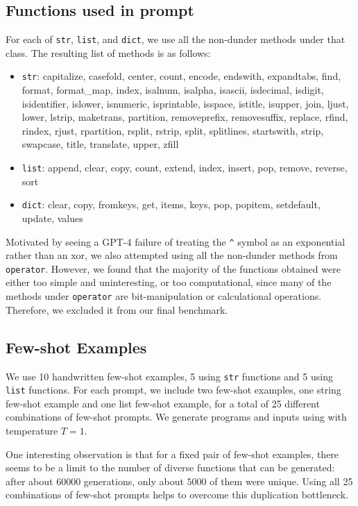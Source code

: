 \subsection{Functions used in prompt} \label{appendix:benchmark-generation-functions}
For each of \texttt{str}, \texttt{list}, and \texttt{dict}, we use all the non-dunder methods under that class. The resulting list of methods is as follows:
\begin{itemize}
    \item \texttt{str}: capitalize, casefold, center, count, encode, endswith, expandtabs, find, format, format\_map, index, isalnum, isalpha, isascii, isdecimal, isdigit, isidentifier, islower, isnumeric, isprintable, isspace, istitle, isupper, join, ljust, lower, lstrip, maketrans, partition, removeprefix, removesuffix, replace, rfind, rindex, rjust, rpartition, rsplit, rstrip, split, splitlines, startswith, strip, swapcase, title, translate, upper, zfill
    \item \texttt{list}: append, clear, copy, count, extend, index, insert, pop, remove, reverse, sort
    \item \texttt{dict}: clear, copy, fromkeys, get, items, keys, pop, popitem, setdefault, update, values
\end{itemize}

Motivated by seeing a GPT-4 failure of treating the \texttt{\^} symbol as an exponential rather than an xor, we also attempted using all the non-dunder methods from \texttt{operator}. However, we found that the majority of the functions obtained were either too simple and uninteresting, or too computational, since many of the methods under \texttt{operator} are bit-manipulation or calculational operations. Therefore, we excluded it from our final benchmark.

\subsection{Few-shot Examples} \label{appendix:benchmark-generation-fewshot}
We use 10 handwritten few-shot examples, 5 using \texttt{str} functions and 5 using \texttt{list} functions. For each prompt, we include two few-shot examples, one string few-shot example and one list few-shot example, for a total of 25 different combinations of few-shot prompts. We generate programs and inputs using \codellamalarge with temperature $T=1$. 

One interesting observation is that for a fixed pair of few-shot examples, there seems to be a limit to the number of diverse functions that can be generated: after about $60000$ generations, only about $5000$ of them were unique. Using all 25 combinations of few-shot prompts helps to overcome this duplication bottleneck.

